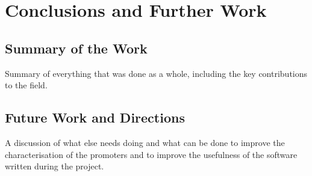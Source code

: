 
\chapter{Conclusions and Further Work}
\label{chap:Conclusions} 

\section{Summary of the Work}

Summary of everything that was done as a whole, including the key contributions
to the field.

\section{Future Work and Directions}

A discussion of what else needs doing and what can be done to improve the
characterisation of the promoters and to improve the usefulness of the software
written during the project.


